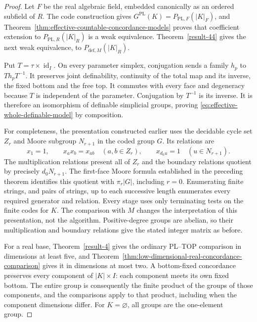 \begin{proof}
Let $F$ be the real algebraic field, embedded canonically
as an ordered subfield of $R$. The code construction gives
$G^{\mathrm{PL}}(K)=P_{\mathrm{PL},F}(|K|_F)$, and
Theorem~\ref{thm:effective-countable-concordance-models}
proves that coefficient extension to
$P_{\mathrm{PL},R}(|K|_R)$ is a weak equivalence.
Theorem~\ref{result-44} gives the next weak equivalence,
to $P_{\mathrm{def},M}(|K|_R)$.

Put $T=\tau\times\operatorname{id}_I$. On every parameter
simplex, conjugation sends a family $h_p$ to
$T h_pT^{-1}$. It preserves joint definability, continuity
of the total map and its inverse, the fixed bottom and
the free top. It commutes with every face and degeneracy
because $T$ is independent of the parameter. Conjugation
by $T^{-1}$ is its inverse. It is therefore an isomorphism
of definable simplicial groups, proving
\eqref{eq:effective-whole-definable-model} by composition.

For completeness, the presentation constructed earlier
uses the decidable cycle set $Z_r$ and Moore subgroup
$N_{r+1}$ in the coded group $G$. Its relations are
\[
 x_1=1,\qquad x_ax_b=x_{ab}\quad(a,b\in Z_r),
 \qquad x_{d_0u}=1\quad(u\in N_{r+1}).
\]
The multiplication relations present all of $Z_r$ and
the boundary relations quotient by precisely $d_0N_{r+1}$.
The first-face Moore formula established in the preceding
theorem identifies this quotient with $\pi_r|G|$, including
$r=0$. Enumerating finite strings, and pairs of strings,
up to each successive length enumerates every required
generator and relation. Every stage uses only terminating
tests on the finite codes for $K$. The comparison with
$M$ changes the interpretation of this presentation,
not the algorithm. Positive-degree groups are abelian,
so their multiplication and boundary relations give the
stated integer matrix as before.

For a real base, Theorem~\ref{result-4} gives the ordinary
PL--TOP comparison in dimensions at least five, and
Theorem~\ref{thm:low-dimensional-real-concordance-comparison}
gives it in dimensions at most two. A bottom-fixed
concordance preserves every component of $|K|\times I$:
each component meets its own fixed bottom. The entire
group is consequently the finite product of the groups
of those components, and the comparisons apply to that
product, including when the component dimensions differ.
For $K=\varnothing$, all groups are the one-element group.
\end{proof}
